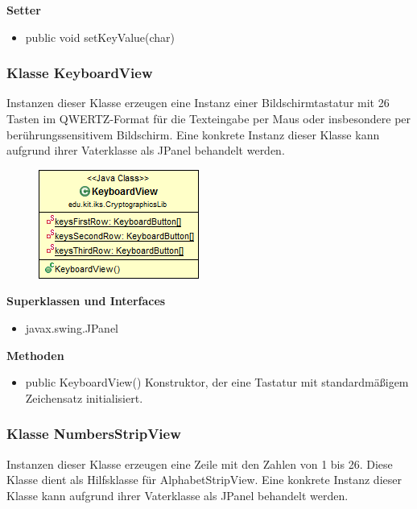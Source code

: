 \documentclass{article}
\begin{document}
      \textbf{Setter}
      \begin{itemize}
        \item public void setKeyValue(char)
      \end{itemize}
	
	\subsubsection{Klasse KeyboardView}
	  Instanzen dieser Klasse erzeugen eine Instanz einer Bildschirmtastatur mit 26 Tasten im QWERTZ-Format für die Texteingabe per Maus oder insbesondere per berührungssensitivem Bildschirm. Eine konkrete Instanz dieser Klasse kann aufgrund ihrer Vaterklasse als JPanel behandelt werden.
	
      \begin{figure}[H]
        \centering
        \includegraphics{resources/edu-kit-iks-CryptographicsLib-KeyboardView}
      \end{figure}
	
      \textbf{Superklassen und Interfaces}
      \begin{itemize}
        \item javax.swing.JPanel
      \end{itemize}
	
      \textbf{Methoden}
      \begin{itemize}
        \item public KeyboardView()
          Konstruktor, der eine Tastatur mit standardmäßigem Zeichensatz initialisiert.
      \end{itemize}
	
	\subsubsection{Klasse NumbersStripView}
	  Instanzen dieser Klasse erzeugen eine Zeile mit den Zahlen von 1 bis 26.
	  Diese Klasse dient als Hilfsklasse für AlphabetStripView.
	  Eine konkrete Instanz dieser Klasse kann aufgrund ihrer Vaterklasse als JPanel behandelt werden.
	
\end{document}
